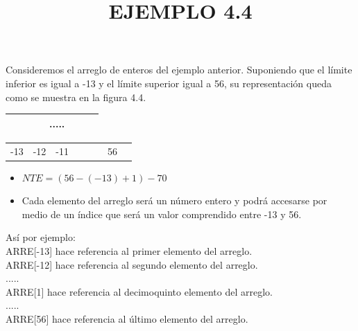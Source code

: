 \documentclass[11pt]{amsart}
\title{EJEMPLO 4.4}
\begin{document}
\maketitle
\noindent Consideremos el arreglo de enteros del ejemplo anterior. Suponiendo que el límite inferior es igual a -13 y el límite superior igual a 56, su representación queda como se muestra en la figura 4.4.\\

\begin{table}[htbp]
\centering
\label{tab:corrida}
\resizebox{5cm}{!} {
\begin{tabular}{|c|c|c|c|c|c|c|c|}
\hline
 &  &  &  &  .....  & &   \\
 \hline
 \end{tabular}
 }
 \end{table}
 
 \begin{table}[htbp]
\centering
\label{tab:corrida}
\resizebox{5cm}{!} {
\begin{tabular}{cccccccc}
-13 & -12 & -11 &   & &  &56\\
\end{tabular}
}
 \end{table}

\begin{itemize}
  \item $NTE = (56 - (-13) + 1) - 70$
  \item \noindent Cada elemento del arreglo será un número entero y podrá accesarse por medio de un índice que será un valor comprendido entre -13 y 56. \\
\end{itemize} 

\noindent Así por ejemplo: \\

\noindent ARRE[-13] hace referencia al primer elemento del arreglo.\\
                ARRE[-12] hace referencia al segundo elemento del arreglo.\\
                .....\\
                ARRE[1] hace referencia al decimoquinto elemento del arreglo.\\
                .....\\
                ARRE[56] hace referencia al último elemento del arreglo.\\
                
\end{document}
